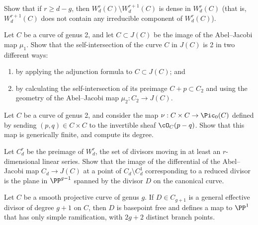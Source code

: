 \begin{exercise}
Show that if $r \geq d-g$, then $W^r_d(C) \setminus W^{r+1}_d(C)$ is
dense in $W^r_d(C)$ (that is, $W^{r+1}_d(C)$ does not contain any
irreducible component of $W^r_d(C)$).
\end{exercise}

\begin{exercise}
Let $C$ be a curve of genus 2, and let $C \subset J(C)$ be the image
of the
Abel--Jacobi map
%
$\mu_1$. Show that the
self-intersection
%
of the curve $C$ in $J(C)$ is 2 in two different ways:
\begin{enumerate}
\item by applying the
adjunction formula
%
 to $C \subset J(C)$; and
\item by calculating the self-intersection of its preimage
$C + p \subset C_2$ and using the geometry of the
Abel--Jacobi map $\mu_2 : C_2 \to J(C)$.
\end{enumerate}\label{tnih5.6}
\end{exercise}

\begin{exercise}
Let $C$ be a curve of genus 2, and consider the map $\nu : C \times C
\to \Pic_0(C)$ defined by sending $(p, q)\in C \times C$ to the
invertible sheaf $\cO_C(p-q)$. Show that this map is
generically finite,
%
and compute its degree.
\end{exercise}

\begin{exercise} \label{comparison with geometric RR}
Let $C^{r}_{d}$ be the preimage of $W^{r}_{d}$, the set of divisors moving in at least an $r$-dimensional linear series.
Show that the image of the
differential of the Abel--Jacobi map
%
$C_{d}
\to J(C)$ at a point of $C_{d} \setminus C^1_d$  corresponding to a
reduced divisor
%
 is  the plane in $\PP^{g-1}$ spanned by the divisor
$D$ on the canonical curve.
\end{exercise}

\begin{exercise}[$g+1$ theorem]\label{g+1 theorem}
Let $C$ be a smooth projective curve of genus $g$.
%
If $D \in C_{g+1}$ is a
general effective divisor
%
of degree $g+1$ on $C$, then
$D$ is basepoint free and defines a  map to $\PP^1$ that has only
simple ramification, with $2g+2$ distinct
%
branch points.
\end{exercise}


